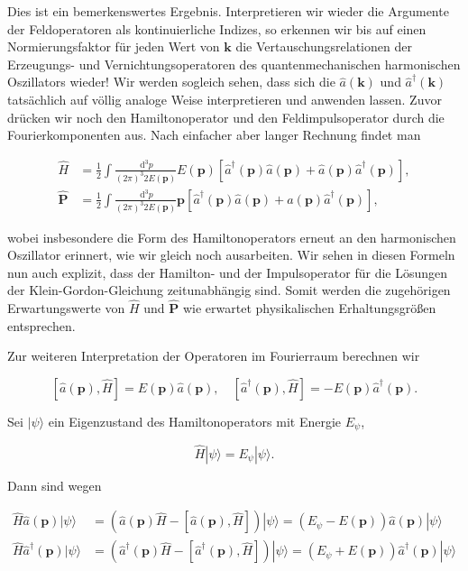 \documentclass[10pt, letterpaper]{article}
\begin{document}
Dies ist ein bemerkenswertes Ergebnis. Interpretieren wir wieder die Argumente der Feldoperatoren als kontinuierliche Indizes, so erkennen wir bis auf einen Normierungsfaktor für jeden Wert von $\mathbf{k}$ die Vertauschungsrelationen der Erzeugungs- und Vernichtungsoperatoren des quantenmechanischen harmonischen Oszillators wieder! Wir werden sogleich sehen, dass sich die $\hat{a}(\mathbf{k})$ und $\hat{a}^{\dagger}(\mathbf{k})$ tatsächlich auf völlig analoge Weise interpretieren und anwenden lassen. Zuvor drücken wir noch den Hamiltonoperator und den Feldimpulsoperator durch die Fourierkomponenten aus. Nach einfacher aber langer Rechnung findet man

$$
\begin{aligned}
\hat{H} & =\frac{1}{2} \int \frac{\mathrm{~d}^{3} p}{(2 \pi)^{3} 2 E(\mathbf{p})} E(\mathbf{p})\left[\hat{a}^{\dagger}(\mathbf{p}) \hat{a}(\mathbf{p})+\hat{a}(\mathbf{p}) \hat{a}^{\dagger}(\mathbf{p})\right], \\
\hat{\mathbf{P}} & =\frac{1}{2} \int \frac{\mathrm{~d}^{3} p}{(2 \pi)^{3} 2 E(\mathbf{p})} \mathbf{p}\left[\hat{a}^{\dagger}(\mathbf{p}) \hat{a}(\mathbf{p})+\hat{a}(\mathbf{p}) \hat{a}^{\dagger}(\mathbf{p})\right],
\end{aligned}
$$

wobei insbesondere die Form des Hamiltonoperators erneut an den harmonischen Oszillator erinnert, wie wir gleich noch ausarbeiten. Wir sehen in diesen Formeln nun auch explizit, dass der Hamilton- und der Impulsoperator für die Lösungen der Klein-Gordon-Gleichung zeitunabhängig sind. Somit werden die zugehörigen Erwartungswerte von $\hat{H}$ und $\hat{\mathbf{P}}$ wie erwartet physikalischen Erhaltungsgrößen entsprechen.

Zur weiteren Interpretation der Operatoren im Fourierraum berechnen wir

$$
[\hat{a}(\mathbf{p}), \hat{H}]=E(\mathbf{p}) \hat{a}(\mathbf{p}), \quad\left[\hat{a}^{\dagger}(\mathbf{p}), \hat{H}\right]=-E(\mathbf{p}) \hat{a}^{\dagger}(\mathbf{p}) .
$$

Sei $|\psi\rangle$ ein Eigenzustand des Hamiltonoperators mit Energie $E_{\psi}$,

$$
\hat{H}|\psi\rangle=E_{\psi}|\psi\rangle .
$$

Dann sind wegen

$$
\begin{aligned}
\hat{H} \hat{a}(\mathbf{p})|\psi\rangle & =(\hat{a}(\mathbf{p}) \hat{H}-[\hat{a}(\mathbf{p}), \hat{H}])|\psi\rangle=\left(E_{\psi}-E(\mathbf{p})\right) \hat{a}(\mathbf{p})|\psi\rangle \\
\hat{H} \hat{a}^{\dagger}(\mathbf{p})|\psi\rangle & =\left(\hat{a}^{\dagger}(\mathbf{p}) \hat{H}-\left[\hat{a}^{\dagger}(\mathbf{p}), \hat{H}\right]\right)|\psi\rangle=\left(E_{\psi}+E(\mathbf{p})\right) \hat{a}^{\dagger}(\mathbf{p})|\psi\rangle
\end{aligned}
$$
\end{document}
